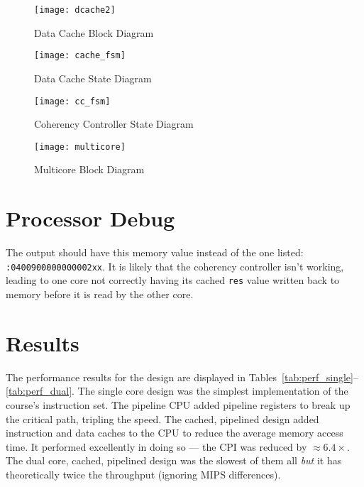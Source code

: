 \documentclass[12pt]{article}
\begin{document}
\begin{figure}
	\begin{center}
		\texttt{[image: dcache2]}
	\end{center}
	\caption{Data Cache Block Diagram}
	\label{fig:dcache}
\end{figure}


\newpage

\begin{figure}
	\begin{center}
		\texttt{[image: cache\_fsm]}
	\end{center}
	\caption{Data Cache State Diagram}
	\label{fig:cache_fsm}
\end{figure}



\newpage

\begin{figure}
	\begin{center}
		\texttt{[image: cc\_fsm]}
	\end{center}
	\caption{Coherency Controller State Diagram}
	\label{fig:cc_fsm}
\end{figure}


\newpage

\begin{figure}
	\begin{center}
		\texttt{[image: multicore]}
	\end{center}
	\caption{Multicore Block Diagram}
	\label{fig:dcache}
\end{figure}

\newpage

\newpage
\section{Processor Debug}

The output should have this memory value instead of the one listed: \texttt{:0400900000000002xx}. It is likely that the coherency controller isn't working, leading to one core not correctly having its cached \texttt{res} value written back to memory before it is read by the other core.\\


\newpage
  \section{Results}
  
The performance results for the design are displayed in Tables~\ref{tab:perf_single}--\ref{tab:perf_dual}. The single core design was the simplest implementation of the course's instruction set. The pipeline CPU added pipeline registers to break up the critical path, tripling the speed. The cached, pipelined design added instruction and data caches to the CPU to reduce the average memory access time. It performed excellently in doing so --- the CPI was reduced by $\approx 6.4 \times$. The dual core, cached, pipelined design was the slowest of them all \emph{but} it has theoretically twice the throughput (ignoring MIPS differences).\\
\end{document}
